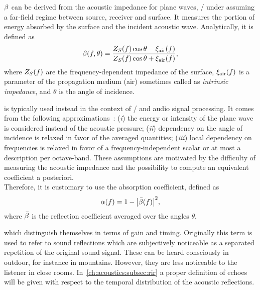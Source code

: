  $\beta$ can be derived from the acoustic impedance
for plane waves, \ie/ under assuming a far-field regime between source, receiver and surface.
It measures the portion of energy absorbed by the surface and the incident acoustic wave.
Analytically, it is defined as  
\begin{equation}
    \beta(f, \theta) = \frac{Z_{S}(f)\cos{\theta} - \xi_\text{air}(f)}{Z_{S}(f)\cos{\theta} + \xi_\text{air}(f)}
    ,
\end{equation}
where $Z_{S}(f)$ are the frequency-dependent impedance of the surface, $\xi_\text{air}(f)$ is a parameter of the propagation medium (air)
sometimes called as \textit{intrinsic impedance}, and $\theta$ is the angle of incidence.

 is typically used instead in the context of \GA/ and audio signal processing.
It comes from the following approximations~:
(\textit{i}) the energy or intensity of the plane wave is considered instead of the acoustic pressure;
(\textit{ii}) dependency on the angle of incidence is relaxed in favor of the averaged quantities;
(\textit{iii}) local dependency on frequencies is relaxed in favor of a frequency-independent scalar or at most a description per octave-band.
These assumptions are motivated by the difficulty of measuring the acoustic impedance
and the possibility to compute an equivalent coefficient a posteriori.
\\Therefore, it is customary to use the absorption coefficient, defined as
\begin{equation}
    \absCoeff(f) = 1 - \abs{\bar{\reflCoeff}(f)}^2
    ,
\end{equation}
where $\bar{\beta}$ is the reflection coefficient averaged over the angles $\theta$.

 which  distinguish themselves in terms of gain and timing.
Originally this term is used to refer to sound reflections which are subjectively noticeable as a separated repetition of the original sound signal.
These can be heard consciously in outdoor, for instance in mountains. However, they are less noticeable to the listener in close rooms.
In~\cref{ch:acoustics:subsec:rir} a proper definition of echoes will be given with respect to the temporal distribution of the acoustic reflections.

